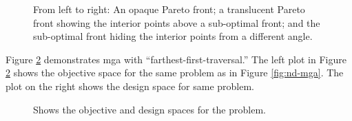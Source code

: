 \begin{figure}[H]
  \centering
  \resizebox{1\columnwidth}{!}{}
  \caption{From left to right: An opaque Pareto front; a translucent Pareto front showing the interior points above a sub-optimal front; and the sub-optimal front hiding the interior points from a different angle.}
  \label{fig:3d-mga}
\end{figure}

Figure \ref{fig:mga-fft} demonstrates \ac{mga} with ``farthest-first-traversal.'' The left plot in Figure \ref{fig:mga-fft} shows the objective space for the same problem as in Figure \ref{fig:nd-mga}. The plot on the right shows the design
space for same problem.

\begin{figure}[H]
  \centering
  \resizebox{1\columnwidth}{!}{}
  \caption{Shows the objective and design spaces for the problem.}
  \label{fig:mga-fft}
\end{figure}